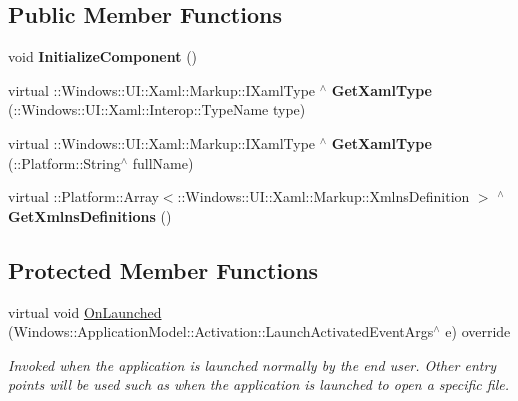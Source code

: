 \subsection*{Public Member Functions}
\begin{DoxyCompactItemize}
\item 
\mbox{\label{class_thermostat_1_1_app_a26e0b25473421b761342a923058f8e65}} 
void {\bfseries Initialize\+Component} ()
\item 
\mbox{\label{class_thermostat_1_1_app_a7ab270c3097106aa1798e8cad45a064d}} 
virtual \+::Windows\+::\+U\+I\+::\+Xaml\+::\+Markup\+::\+I\+Xaml\+Type $^\wedge$ {\bfseries Get\+Xaml\+Type} (\+::Windows\+::\+U\+I\+::\+Xaml\+::\+Interop\+::\+Type\+Name type)
\item 
\mbox{\label{class_thermostat_1_1_app_aa919a5c939140144a2c8d56a6613f49d}} 
virtual \+::Windows\+::\+U\+I\+::\+Xaml\+::\+Markup\+::\+I\+Xaml\+Type $^\wedge$ {\bfseries Get\+Xaml\+Type} (\+::Platform\+::\+String$^\wedge$ full\+Name)
\item 
\mbox{\label{class_thermostat_1_1_app_a8af94ffafa76c0c8fecf82cd45e009bf}} 
virtual \+::Platform\+::\+Array$<$\+::Windows\+::\+U\+I\+::\+Xaml\+::\+Markup\+::\+Xmlns\+Definition $>$ $^\wedge$ {\bfseries Get\+Xmlns\+Definitions} ()
\end{DoxyCompactItemize}
\subsection*{Protected Member Functions}
\begin{DoxyCompactItemize}
\item 
virtual void \mbox{\hyperlink{class_thermostat_1_1_app_adffebc0581348c6095a509dc8b1726e7}{On\+Launched}} (Windows\+::\+Application\+Model\+::\+Activation\+::\+Launch\+Activated\+Event\+Args$^\wedge$ e) override
\begin{DoxyCompactList}\small\item\em Invoked when the application is launched normally by the end user. Other entry points will be used such as when the application is launched to open a specific file. \end{DoxyCompactList}\end{DoxyCompactItemize}


